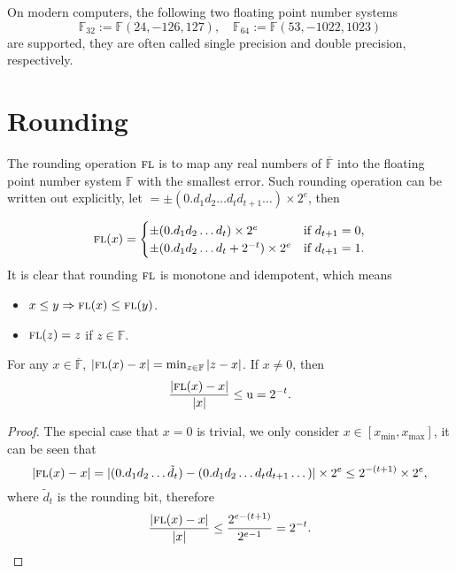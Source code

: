 \begin{remark}
On modern computers, the following two floating point number systems $$\mathbb{F}_{32}:= \mathbb{F}(24, -126, 127),\quad\mathbb{F}_{64}:= \mathbb{F}(53, -1022, 1023)$$ are supported, they are often called single precision and double precision, respectively.  
\end{remark}

\section{Rounding}
\label{Sec: 1-Rou}
The rounding operation $\textsc{fl}$ is to map any real numbers of $\overline{\mathbb{F}}$ into the floating point number system $\mathbb{F}$ with the smallest error. Such rounding operation can be written out explicitly, let $ = \pm (0.d_1 d_2\dots d_t d_{t+1}\dots )\times 2^e$, then

\begin{equation*}
    \textsc{fl}(x) =\begin{cases}
        \pm (0.d_1 d_2\dots d_t) \times 2^e & \text{if } d_{t+1} = 0,\\
        \pm (0.d_1 d_2\dots d_t  + 2^{-t}) \times 2^e & \text{if } d_{t+1} = 1.
    \end{cases}
\end{equation*}
It is clear that rounding $\textsc{fl}$ is monotone and idempotent, which means
\begin{itemize}
    \item $x\le y \Rightarrow \textsc{fl}(x) \le \textsc{fl}(y)$. 
    \item $\textsc{fl}(z) = z$ if $z\in \mathbb{F}$.
\end{itemize}


\begin{theorem}
\label{Thm: 1-Rou-err}
    For any $x\in \overline{\mathbb{F}}$, $|\textsc{fl}(x) - x| = \min_{z\in \mathbb{F}} |z - x|$. If $x\neq 0$, then
    $$\frac{|\textsc{fl}(x) - x|}{|x|}\le \mathrm{u} = 2^{-t}.$$
\end{theorem}

\begin{proof}
    The special case that $x = 0$ is trivial, we only consider $x\in [x_{\min}, x_{\max}]$, it can be seen that 
    \begin{equation*}
        |\textsc{fl}(x) - x| = | (0.d_1d_2\dots \tilde{d}_t) - (0.d_1d_2\dots d_t d_{t+1} \dots )|\times 2^e \le 2^{-(t+1)} \times 2^e,
    \end{equation*}
    where $\tilde{d}_t$ is the rounding bit, therefore 
    \begin{equation*}
        \frac{|\textsc{fl}(x) - x|}{|x|} \le \frac{2^{e-(t+1)}}{2^{e-1}} = 2^{-t}.
    \end{equation*}
\end{proof}

